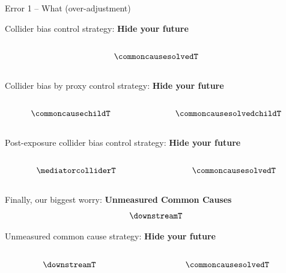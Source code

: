 \documentclass[
  ignorenonframetext,
  aspectratio=169,
]{beamer}
\begin{document}
\begin{frame}[fragile]{Error 1 -- What (over-adjustment)}
\begin{block}{Collider bias control strategy: \textbf{Hide your future}}
\begin{columns}[T]
\begin{column}{0.5\linewidth}
\[\commoncausesolvedT\]
\end{column}
\end{columns}
\end{block}

\begin{block}{Collider bias by proxy control strategy: \textbf{Hide your
future}}
\label{collider-bias-by-proxy-control-strategy-hide-your-future}
\begin{columns}[T]
\begin{column}{0.5\linewidth}
\[\commoncausechildT\]
\end{column}

\begin{column}{0.5\linewidth}
\[\commoncausesolvedchildT\]
\end{column}
\end{columns}
\end{block}

\begin{block}{Post-exposure collider bias control strategy: \textbf{Hide
your future}}
\label{post-exposure-collider-bias-control-strategy-hide-your-future}
\begin{columns}[T]
\begin{column}{0.5\linewidth}
\[\mediatorcolliderT\]
\end{column}

\begin{column}{0.5\linewidth}
\[\commoncausesolvedT\]
\end{column}
\end{columns}
\end{block}

\begin{block}{Finally, our biggest worry: \textbf{Unmeasured Common
Causes}}
\label{finally-our-biggest-worry-unmeasured-common-causes}
\[\downstreamT\]
\end{block}

\begin{block}{Unmeasured common cause strategy: \textbf{Hide your
future}}
\label{unmeasured-common-cause-strategy-hide-your-future}
\begin{columns}[T]
\begin{column}{0.5\linewidth}
\[\downstreamT\]
\end{column}

\begin{column}{0.5\linewidth}
\[\commoncausesolvedT\]
\end{column}
\end{columns}


\end{block}
\end{frame}
\end{document}
